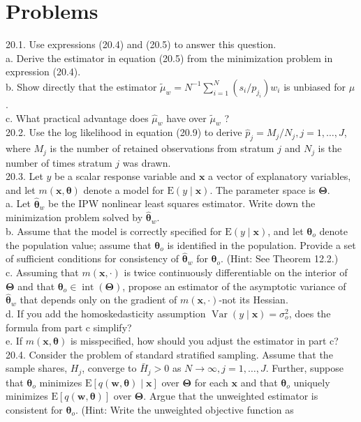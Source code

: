 \documentclass[10pt]{article}
\begin{document}
\section*{Problems}
20.1. Use expressions (20.4) and (20.5) to answer this question.\\
a. Derive the estimator in equation (20.5) from the minimization problem in expression (20.4).\\
b. Show directly that the estimator $\tilde{\mu}_{w}=N^{-1} \sum_{i=1}^{N}\left(s_{i} / p_{j_{i}}\right) w_{i}$ is unbiased for $\mu$.\\
c. What practical advantage does $\hat{\mu}_{w}$ have over $\tilde{\mu}_{w}$ ?\\
20.2. Use the log likelihood in equation (20.9) to derive $\hat{p}_{j}=M_{j} / N_{j}, j=1, \ldots, J$, where $M_{j}$ is the number of retained observations from stratum $j$ and $N_{j}$ is the number of times stratum $j$ was drawn.\\
20.3. Let $y$ be a scalar response variable and $\mathbf{x}$ a vector of explanatory variables, and let $m(\mathbf{x}, \boldsymbol{\theta})$ denote a model for $\mathrm{E}(y \mid \mathbf{x})$. The parameter space is $\boldsymbol{\Theta}$.\\
a. Let $\hat{\boldsymbol{\theta}}_{w}$ be the IPW nonlinear least squares estimator. Write down the minimization problem solved by $\hat{\boldsymbol{\theta}}_{w}$.\\
b. Assume that the model is correctly specified for $\mathrm{E}(y \mid \mathbf{x})$, and let $\boldsymbol{\theta}_{o}$ denote the population value; assume that $\boldsymbol{\theta}_{o}$ is identified in the population. Provide a set of sufficient conditions for consistency of $\hat{\boldsymbol{\theta}}_{w}$ for $\boldsymbol{\theta}_{o}$. (Hint: See Theorem 12.2.)\\
c. Assuming that $m(\mathbf{x}, \cdot)$ is twice continuously differentiable on the interior of $\boldsymbol{\Theta}$ and that $\boldsymbol{\theta}_{o} \in \operatorname{int}(\boldsymbol{\Theta})$, propose an estimator of the asymptotic variance of $\hat{\boldsymbol{\theta}}_{w}$ that depends only on the gradient of $m(\mathbf{x}, \cdot)$-not its Hessian.\\
d. If you add the homoskedasticity assumption $\operatorname{Var}(y \mid \mathbf{x})=\sigma_{o}^{2}$, does the formula from part c simplify?\\
e. If $m(\mathbf{x}, \boldsymbol{\theta})$ is misspecified, how should you adjust the estimator in part c?\\
20.4. Consider the problem of standard stratified sampling. Assume that the sample shares, $H_{j}$, converge to $\bar{H}_{j}>0$ as $N \rightarrow \infty, j=1, \ldots, J$. Further, suppose that $\boldsymbol{\theta}_{o}$ minimizes $\mathrm{E}[q(\mathbf{w}, \boldsymbol{\theta}) \mid \mathbf{x}]$ over $\boldsymbol{\Theta}$ for each $\mathbf{x}$ and that $\boldsymbol{\theta}_{o}$ uniquely minimizes $\mathrm{E}[q(\mathbf{w}, \boldsymbol{\theta})]$ over $\boldsymbol{\Theta}$. Argue that the unweighted estimator is consistent for $\boldsymbol{\theta}_{o}$. (Hint: Write the unweighted objective function as
\end{document}
